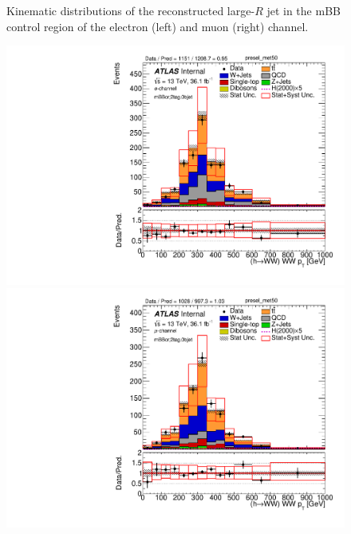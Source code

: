 \begin{figure}[!h]
\begin{center}
\caption{Kinematic distributions of the reconstructed large-$R$ jet in the mBB control region of the electron (left) and muon (right) channel.}
\label{fig:boosted_mbbcrleptons_largerjet}
\end{center}
\end{figure}

\begin{figure}[!h]
\begin{center}
\includegraphics[scale=0.33]{./figures/boosted/PlotByChannels/DataMC_2tag_0bjet_mbbcr_elec_presel_met50_WWPt}                                                                                       
\includegraphics[scale=0.33]{./figures/boosted/PlotByChannels/DataMC_2tag_0bjet_mbbcr_muon_presel_met50_WWPt}                                                                                       

\end{center}
\end{figure}
